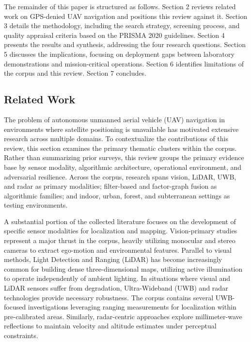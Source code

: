 \documentclass[conference]{IEEEtran}
\begin{document}
The remainder of this paper is structured as follows. Section 2 reviews related work on GPS-denied UAV navigation and positions this review against it. Section 3 details the methodology, including the search strategy, screening process, and quality appraisal criteria based on the PRISMA 2020 guidelines. Section 4 presents the results and synthesis, addressing the four research questions. Section 5 discusses the implications, focusing on deployment gaps between laboratory demonstrations and mission-critical operations. Section 6 identifies limitations of the corpus and this review. Section 7 concludes.



\subsection{Related Work}


The problem of autonomous unmanned aerial vehicle (UAV) navigation in environments where satellite positioning is unavailable has motivated extensive research across multiple domains. To contextualize the contributions of this review, this section examines the primary thematic clusters within the corpus. Rather than summarizing prior surveys, this review groups the primary evidence base by sensor modality, algorithmic architecture, operational environment, and adversarial resilience. Across the corpus, research spans vision, LiDAR, UWB, and radar as primary modalities; filter-based and factor-graph fusion as algorithmic families; and indoor, urban, forest, and subterranean settings as testing environments.


A substantial portion of the collected literature focuses on the development of specific sensor modalities for localization and mapping. Vision-primary studies represent a major thrust in the corpus, heavily utilizing monocular and stereo cameras to extract ego-motion and environmental features. Parallel to visual methods, Light Detection and Ranging (LiDAR) has become increasingly common for building dense three-dimensional maps, utilizing active illumination to operate independently of ambient lighting. In situations where visual and LiDAR sensors suffer from degradation, Ultra-Wideband (UWB) and radar technologies provide necessary robustness. The corpus contains several UWB-focused investigations leveraging ranging measurements for localization within pre-calibrated areas. Similarly, radar-centric approaches explore millimeter-wave reflections to maintain velocity and altitude estimates under perceptual constraints. 
\end{document}
